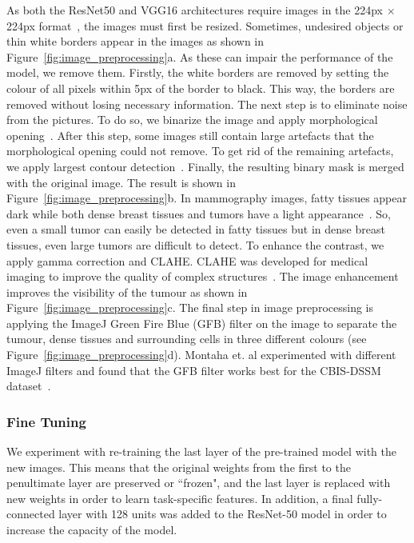\documentclass[sn-mathphys,Numbered]{sn-jnl}%
\theoremstyle{thmstyleone}%
\theoremstyle{thmstyletwo}%
\theoremstyle{thmstylethree}%
\begin{document}
\noindent As both the ResNet50 and VGG16 architectures require images in the 224px $\times$ 224px format~\cite{resnet_docu, vgg_docu}, the images must first be resized. Sometimes, undesired objects or thin white borders appear in the images as shown in Figure~\ref{fig:image_preprocessing}a. As these can impair the performance of the model, we remove them. Firstly, the white borders are removed by setting the colour of all pixels within 5px of the border to black. This way, the borders are removed without losing necessary information. The next step is to eliminate noise from the pictures. To do so, we binarize the image and apply morphological opening~\cite{morph}. After this step, some images still contain large artefacts that the morphological opening could not remove. To get rid of the remaining artefacts, we apply largest contour detection~\cite{contours}. Finally, the resulting binary mask is merged with the original image. The result is shown in Figure~\ref{fig:image_preprocessing}b. In mammography images, fatty tissues appear dark while both dense breast tissues and tumors have a light appearance~\cite{Montaha2021}. So, even a small tumor can easily be detected in fatty tissues but in dense breast tissues, even large tumors are difficult to detect. To enhance the contrast, we apply gamma correction and CLAHE. CLAHE was developed for medical imaging to improve the quality of complex structures~\cite{Montaha2021}. The image enhancement improves the visibility of the tumour as shown in Figure~\ref{fig:image_preprocessing}c. The final step in image preprocessing is applying the ImageJ Green Fire Blue (GFB) filter on the image to separate the tumour, dense tissues and surrounding cells in three different colours (see Figure~\ref{fig:image_preprocessing}d). Montaha et. al experimented with different ImageJ filters and found that the GFB filter works best for the CBIS-DSSM dataset~\cite{Montaha2021}.

\subsubsection{Fine Tuning}\label{finetuning}
We experiment with re-training the last layer of the pre-trained model with the new images. This means that the original weights from the first to the penultimate layer are preserved or ``frozen", and the last layer is replaced with new weights in order to learn task-specific features. In addition, a final fully-connected layer with 128 units was added to the ResNet-50 model in order to increase the capacity of the model.
\end{document}
